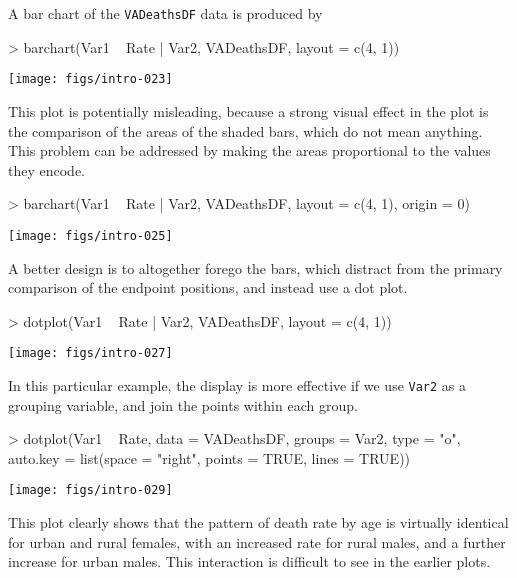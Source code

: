 \documentclass[10pt]{article}
\newcommand{\code}[1]{\texttt{#1}}
\begin{document}
A bar chart of the \code{VADeathsDF} data is produced by
\begin{Schunk}
\begin{Sinput}
> barchart(Var1 ~ Rate | Var2, VADeathsDF, layout = c(4, 1))
\end{Sinput}
\end{Schunk}
\begin{center}
\texttt{[image: figs/intro-023]}
\end{center}
This plot is potentially misleading, because a strong visual effect in
the plot is the comparison of the areas of the shaded bars, which do
not mean anything.  This problem can be addressed by making the areas
proportional to the values they encode.
\begin{Schunk}
\begin{Sinput}
> barchart(Var1 ~ Rate | Var2, VADeathsDF, layout = c(4, 1), origin = 0)
\end{Sinput}
\end{Schunk}
\begin{center}
\texttt{[image: figs/intro-025]}
\end{center}

\newpage

A better design is to altogether forego the bars, which distract from
the primary comparison of the endpoint positions, and instead use a
dot plot.
\begin{Schunk}
\begin{Sinput}
> dotplot(Var1 ~ Rate | Var2, VADeathsDF, layout = c(4, 1))
\end{Sinput}
\end{Schunk}
\begin{center}
\texttt{[image: figs/intro-027]}
\end{center}
In this particular example, the display is more effective if we use
\code{Var2} as a grouping variable, and join the points within each
group.  
\begin{Schunk}
\begin{Sinput}
> dotplot(Var1 ~ Rate, data = VADeathsDF, groups = Var2, type = "o", 
          auto.key = list(space = "right", points = TRUE, lines = TRUE))
\end{Sinput}
\end{Schunk}
\begin{center}
\texttt{[image: figs/intro-029]}
\end{center}
This plot clearly shows that the pattern of death rate by age is
virtually identical for urban and rural females, with an increased
rate for rural males, and a further increase for urban males.  This
interaction is difficult to see in the earlier plots.
\end{document}
